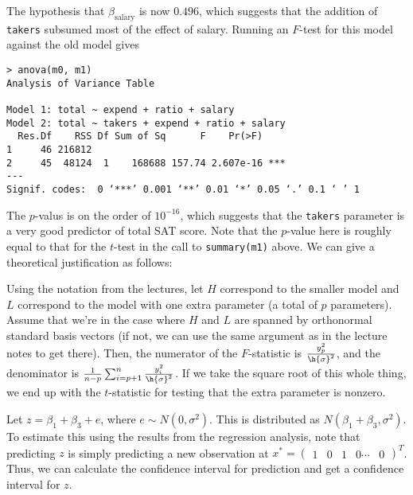 \documentclass{article}
\newcommand{\openm}{\begin{pmatrix}}
\newcommand{\closem}{\end{pmatrix}}
\begin{document}
The hypothesis that $\beta_\text{salary}$ is now $0.496$, which suggests that the addition of \verb|takers| subsumed most of the effect of salary. Running an $F$-test for this model against the old model gives
\begin{verbatim}
> anova(m0, m1)
Analysis of Variance Table

Model 1: total ~ expend + ratio + salary
Model 2: total ~ takers + expend + ratio + salary
  Res.Df    RSS Df Sum of Sq      F    Pr(>F)    
1     46 216812                                  
2     45  48124  1    168688 157.74 2.607e-16 ***
---
Signif. codes:  0 ‘***’ 0.001 ‘**’ 0.01 ‘*’ 0.05 ‘.’ 0.1 ‘ ’ 1
\end{verbatim}

The $p$-valus is on the order of $10^{-16}$, which suggests that the \verb|takers| parameter is a very good predictor of total SAT score. Note that the $p$-value here is roughly equal to that for the $t$-test in the call to \verb|summary(m1)| above. We can give a theoretical justification as follows: 

Using the notation from the lectures, let $H$ correspond to the smaller model and $L$ correspond to the model with one extra parameter (a total of $p$ parameters). Assume that we're in the case where $H$ and $L$ are spanned by orthonormal standard basis vectors (if not, we can use the same argument as in the lecture notes to get there). Then, the numerator of the $F$-statistic is $\frac{y_{p}^2}{\h{\sigma}^2}$, and the denominator is $\frac{1}{n-p}\sum_{i=p+1}^n\frac{y_i^2}{\h{\sigma}^2}$. If we take the square root of this whole thing, we end up with the $t$-statistic for testing that the extra parameter is nonzero. 

Let $z=\beta_1+\beta_3+e$, where $e\sim N(0,\sigma^2)$. This is distributed as $N(\beta_1+\beta_3,\sigma^2)$. To estimate this using the results from the regression analysis, note that predicting $z$ is simply predicting a new observation at $x^*=\openm1&0&1&0\cdots&0\closem^T$. Thus, we can calculate the confidence interval for prediction and get a confidence interval for $z$.
\end{document}
